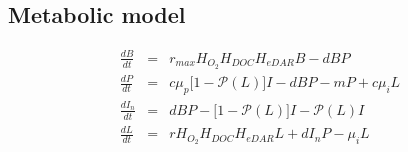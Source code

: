 \documentclass[10pt,a4paper,twoside,onecolumn, english]{report}
\begin{document}
\subsection{Metabolic model}
\begin{eqnarray*}
   \frac{dB}{dt}&=&r_{max}H_{O_2}H_{DOC}H_{eDAR}B - dBP \\
   \frac{dP}{dt}&=&c\mu_p \big[1 - \mathcal{P}(L)\big]I - dBP - mP + c\mu_i L \\
   \frac{dI_n}{dt}&=&dBP - \big[1 - \mathcal{P}(L) \big] I - \mathcal{P}(L)I \\
   \frac{dL}{dt}&=&rH_{O_2}H_{DOC}H_{eDAR}L + dI_nP - \mu_i L \\
\end{eqnarray*}
\end{document}
